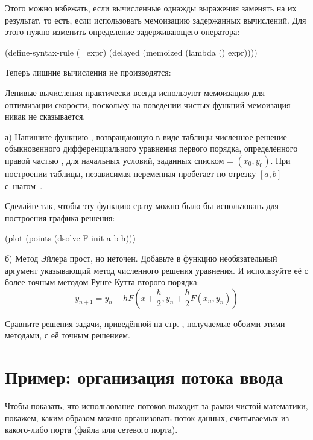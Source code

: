 Этого можно избежать, если вычисленные однажды выражения заменять на их результат, то есть, если использовать мемоизацию задержанных вычислений. Для этого нужно изменить определение задерживающего оператора:
\begin{Definition}
(define-syntax-rule (~ expr)
  (delayed (memoized (lambda () expr))))
\end{Definition}
Теперь лишние вычисления не производятся:
\vspace{-\smallskipamount}
\vspace{-\smallskipamount}
\vspace{-\smallskipamount}
\vspace{-\smallskipamount}

Ленивые вычисления практически всегда используют мемоизацию для оптимизации скорости, поскольку на поведении чистых функций мемоизация никак не сказывается.

\begin{Assignment}
а) Напишите функцию , возвращающую в виде таблицы численное решение обыкновенного дифференциального уравнения первого порядка, определённого правой частью , для начальных условий, заданных списком  = $(x_0,y_0)$. При построении таблицы, независимая переменная пробегает по отрезку $[a,b]$ с~шагом~.

\newpage
Сделайте так, чтобы эту функцию сразу можно было бы использовать для построения графика решения:
\begin{SchemeCode}[emph={F,init,a,b,h}]
(plot (points (dsolve F init a b h)))
\end{SchemeCode}

б) Метод Эйлера прост, но неточен. Добавьте в функцию  необязательный аргумент указывающий метод численного решения уравнения. И используйте её с более точным методом Рунге-Кутта второго порядка: $$y_{n+1} = y_n + h F\left(x+\frac{h}2,y_n + \frac{h}2F(x_n,y_n)\right)$$

Сравните решения задачи, приведённой на стр. \pageref{ode}, получаемые обоими этими методами, с её точным решением.

\end{Assignment}

\section{Пример: организация потока ввода}%
Чтобы показать, что использование потоков выходит за рамки чистой математики, покажем, каким образом можно организовать поток данных, считываемых из какого-либо порта (файла или сетевого порта).

